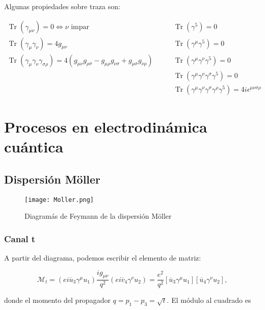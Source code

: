     Algunas propiedades sobre traza son:
    
    \begin{equation}
      \begin{aligned}
      \operatorname{Tr}\left(\gamma_{\mu\nu}\right)=0\Leftrightarrow\nu\text{ impar} \quad& \quad\operatorname{Tr}\left(\gamma^5\right)=0 \\
      \operatorname{Tr}\left(\gamma_\mu\gamma_\nu\right)=4g_{\mu\nu}\quad& \quad \operatorname{Tr}\left(\gamma^\mu \gamma^5\right)=0 \\
      \operatorname{Tr}\left(\gamma_\mu\gamma_\nu\gamma_{\sigma\rho}\right)=4\left(g_{\mu\nu}g_{\rho\sigma}-g_{\mu\rho}g_{\nu\sigma}+g_{\mu\sigma}g_{\nu\rho}\right)\quad& \quad \operatorname{Tr}\left(\gamma^\mu \gamma^\nu \gamma^5\right)=0 \\
      \quad& \quad \operatorname{Tr}\left(\gamma^\mu \gamma^\nu \gamma^\sigma \gamma^5\right)=0 \\
      \quad& \quad \operatorname{Tr}\left(\gamma^\mu \gamma^\nu \gamma^\sigma \gamma^\rho \gamma^5\right)=4i\epsilon^{\mu\nu\sigma\rho}
      \end{aligned}
      \end{equation}
\section{Procesos en electrodinámica cuántica}
\subsection{Dispersión Möller}
\begin{figure}
  \centering
  \texttt{[image: Moller.png]}
  \caption{Diagramás de Feymann de la dispersión Möller}
\end{figure}
\subsubsection{Canal t}
A partir del diagrama, podemos escribir el elemento de matriz:

\begin{equation}
\mathcal{M}_t = (ei\overline{u}_3\gamma^\mu u_1) \frac{ig_{\mu\nu}}{q^2} (ei\overline{v}_4\gamma^\nu u_2) = \frac{e^2}{q^2} [\overline{u}_3\gamma^\mu u_1][\overline{u}_4\gamma^\nu u_2],
\end{equation}

donde el momento del propagador $ q = p_1 - p_3 = \sqrt{t} $. El módulo al cuadrado es

